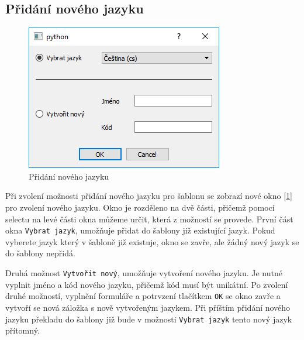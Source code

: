 \documentclass[12pt,a4paper,oneside]{article}
\begin{document}
	\newpage
	

\subsection{Přidání nového jazyku}
	\begin{figure}[h]
  		\centering  		
    		\includegraphics[width=0.7\linewidth]{images/editace_jazyk}
    		\caption{Přidání nového jazyku}
    		\label{fig:editace_jazyk}  	  		
  		\vfill
	\end{figure}	
	Při zvolení možnosti přidání nového jazyku pro šablonu se zobrazí nové okno [\ref{fig:editace_jazyk}] pro zvolení nového jazyku. Okno je rozděleno na dvě části, přičemž pomocí selectu na levé části okna můžeme určit, která z možností se provede. První část okna \texttt{Vybrat jazyk}, umožňuje přidat do šablony již existující jazyk. Pokud vyberete jazyk který v šabloně již existuje, okno se zavře, ale žádný nový jazyk se do šablony nepřidá. \par
	
	Druhá možnost \texttt{Vytvořit nový}, umožňuje vytvoření nového jazyku. Je nutné vyplnit jméno a kód nového jazyku, přičemž kód musí být unikátní. Po zvolení druhé možností, vyplnění formuláře a potrvzení tlačítkem \texttt{OK} se okno zavře a vytvoří se nová záložka s nově vytvořeným jazykem. Při příštím přidání nového jazyku překladu do šablony již bude v možnosti \texttt{Vybrat jazyk} tento nový jazyk přítomný. 
	
	\newpage
	
\end{document}
